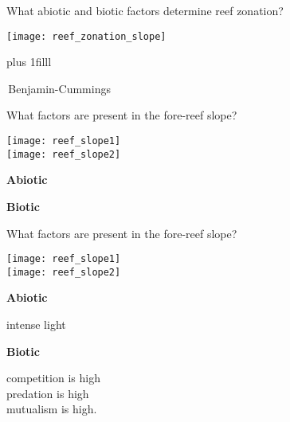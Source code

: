 \documentclass[t]{beamer}
\begin{document}

\begin{frame}[t]{What abiotic and biotic factors determine reef zonation?}

\texttt{[image: reef\_zonation\_slope]}

\vskip0pt plus 1filll

\tiny\textcopyright\,Benjamin-Cummings
\end{frame}

\begin{frame}[t]{What factors are present in the fore-reef slope?}

\begin{multicols}{2}
	\begin{center}
	
	\texttt{[image: reef\_slope1]}\\[1ex]
	
	\texttt{[image: reef\_slope2]}
	\end{center}
\columnbreak

	\hangpara\textbf{Abiotic}
	
	\vspace*{4\baselineskip}
	
	\hangpara\textbf{Biotic}
	
	
\end{multicols}
\end{frame}

\begin{frame}[t]{What factors are present in the fore-reef slope?}

\begin{multicols}{2}
	\begin{center}
	
	\texttt{[image: reef\_slope1]}\\[1ex]
	
	\texttt{[image: reef\_slope2]}
	\end{center}
\columnbreak

	\hangpara\textbf{Abiotic}
	
	\hangpara intense light\pause 

	\hangpara\textbf{Biotic}
	
	\hangpara competition is high\\\pause predation is high\\\pause mutualism is high.

	
\end{multicols}
\end{frame}
\end{document}

